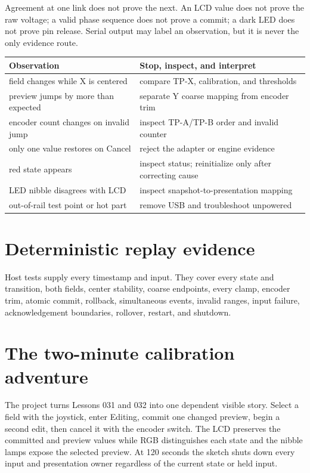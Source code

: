 \documentclass[11pt]{article}
\begin{document}
Agreement at one link does not prove the next. An LCD value does not prove the
raw voltage; a valid phase sequence does not prove a commit; a dark LED does
not prove pin release. Serial output may label an observation, but it is never
the only evidence route.

\begin{tabularx}{\linewidth}{@{}X X@{}}
\toprule
Observation & Stop, inspect, and interpret\\
\midrule
field changes while X is centered & compare TP-X, calibration, and thresholds\\
preview jumps by more than expected & separate Y coarse mapping from encoder trim\\
encoder count changes on invalid jump & inspect TP-A/TP-B order and invalid counter\\
only one value restores on Cancel & reject the adapter or engine evidence\\
red state appears & inspect status; reinitialize only after correcting cause\\
LED nibble disagrees with LCD & inspect snapshot-to-presentation mapping\\
out-of-rail test point or hot part & remove USB and troubleshoot unpowered\\
\bottomrule
\end{tabularx}

\section{Deterministic replay evidence}

Host tests supply every timestamp and input. They cover every state and
transition, both fields, center stability, coarse endpoints, every clamp,
encoder trim, atomic commit, rollback, simultaneous events, invalid ranges,
input failure, acknowledgement boundaries, rollover, restart, and shutdown.

\section{The two-minute calibration adventure}

The project turns Lessons 031 and 032 into one dependent visible story. Select
a field with the joystick, enter Editing, commit one changed preview, begin a
second edit, then cancel it with the encoder switch. The LCD preserves the
committed and preview values while RGB distinguishes each state and the nibble
lamps expose the selected preview. At 120 seconds the sketch shuts down every
input and presentation owner regardless of the current state or held input.
\end{document}
